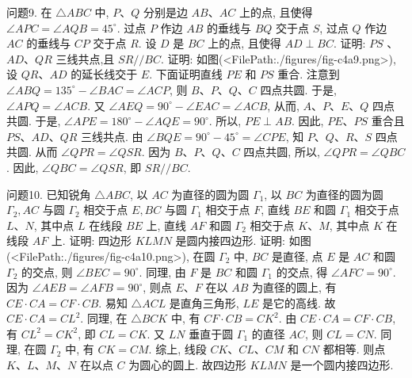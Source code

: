 问题9. 在 $\triangle A B C$ 中, $P 、 Q$ 分别是边 $A B 、 A C$ 上的点, 且使得 $\angle A P C= \angle A Q B=45^{\circ}$. 过点 $P$ 作边 $A B$ 的垂线与 $B Q$ 交于点 $S$, 过点 $Q$ 作边 $A C$ 的垂线与 $C P$ 交于点 $R$. 设 $D$ 是 $B C$ 上的点, 且使得 $A D \perp B C$. 证明: $P S$ 、 $A D 、 Q R$ 三线共点,且 $S R / / B C$.
证明: 如图(<FilePath:./figures/fig-c4a9.png>), 设 $Q R 、 A D$ 的延长线交于 $E$. 下面证明直线 $P E$ 和 $P S$ 重合.
注意到 $\angle A B Q= 135^{\circ}-\angle B A C=\angle A C P$, 则 $B 、 P 、 Q 、 C$ 四点共圆.
于是, $\angle A P Q=\angle A C B$. 又 $\angle A E Q=90^{\circ}- \angle E A C=\angle A C B$, 从而, $A 、 P 、 E 、 Q$ 四点共圆.
于是, $\angle A P E=180^{\circ}-\angle A Q E=90^{\circ}$. 
所以, $P E \perp A B$. 因此, $P E 、 P S$ 重合且 $P S 、 A D 、 Q R$ 三线共点.
由 $\angle B Q E=90^{\circ}- 45^{\circ}=\angle C P E$, 知 $P 、 Q 、 R 、 S$ 四点共圆.
从而 $\angle Q P R=\angle Q S R$. 因为 $B 、 P 、 Q 、 C$ 四点共圆, 所以, $\angle Q P R=\angle Q B C$.
因此, $\angle Q B C=\angle Q S R$, 即 $S R / / B C$.



问题10. 已知锐角 $\triangle A B C$, 以 $A C$ 为直径的圆为圆 $\Gamma_1$, 以 $B C$ 为直径的圆为圆 $\Gamma_2, A C$ 与圆 $\Gamma_2$ 相交于点 $E, B C$ 与圆 $\Gamma_1$ 相交于点 $F$, 直线 $B E$ 和圆 $\Gamma_1$ 相交于点 $L 、 N$, 其中点 $L$ 在线段 $B E$ 上, 直线 $A F$ 和圆 $\Gamma_2$ 相交于点 $K 、 M$, 其中点 $K$ 在线段 $A F$ 上.
证明: 四边形 $K L M N$ 是圆内接四边形.
证明: 如图(<FilePath:./figures/fig-c4a10.png>), 在圆 $\Gamma_2$ 中, $B C$ 是直径, 点 $E$ 是 $A C$ 和圆 $\Gamma_2$ 的交点, 则 $\angle B E C=90^{\circ}$. 同理, 由 $F$ 是 $B C$ 和圆 $\Gamma_1$ 的交点, 得 $\angle A F C=90^{\circ}$. 因为 $\angle A E B=\angle A F B=90^{\circ}$, 则点 $E 、 F$ 在以 $A B$ 为直径的圆上, 有 $C E \cdot C A=C F \cdot C B$. 易知 $\triangle A C L$ 是直角三角形, $L E$ 是它的高线.
故 $C E \cdot C A=C L^2$. 同理, 在 $\triangle B C K$ 中, 有 $C F \cdot C B=C K^2$. 由 $C E \cdot C A= C F \cdot C B$, 有 $C L^2=C K^2$, 即 $C L=C K$. 又 $L N$ 垂直于圆 $\Gamma_1$ 的直径 $A C$, 则 $C L=C N$. 同理, 在圆 $\Gamma_2$ 中, 有 $C K=C M$. 综上, 线段 $C K 、 C L 、 C M$ 和 $C N$ 都相等.
则点 $K 、 L 、 M 、 N$ 在以点 $C$ 为圆心的圆上.
故四边形 $K L M N$ 是一个圆内接四边形.



